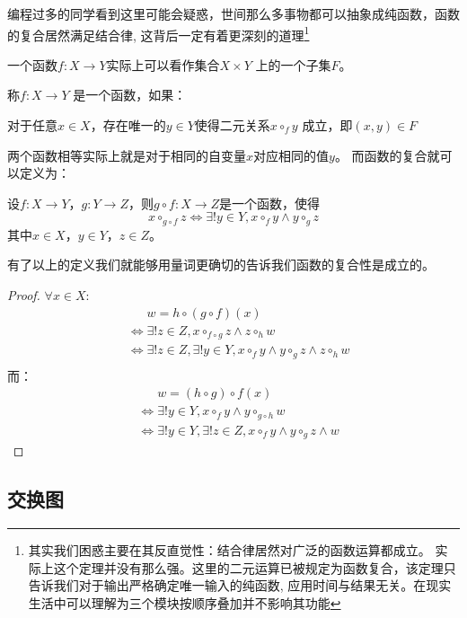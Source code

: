 编程过多的同学看到这里可能会疑惑，世间那么多事物都可以抽象成纯函数，函数的复合居然满足结合律,
这背后一定有着更深刻的道理\footnote{其实我们困惑主要在其反直觉性：结合律居然对广泛的函数运算都成立。
    实际上这个定理并没有那么强。这里的二元运算已被规定为函数复合，该定理只告诉我们对于输出严格确定唯一输入的纯函数,
应用时间与结果无关。在现实生活中可以理解为三个模块按顺序叠加并不影响其功能}

一个函数\(f: X \to Y\)实际上可以看作集合\(X \times Y\) 上的一个子集\(F\)。
\begin{definition}
    称\(f: X\to Y\) 是一个函数，如果：

    对于任意\(x\in X\)，存在唯一的\(y\in Y\)使得二元关系\(x \circ_{f} y\)
    成立，即\((x,y)\in F\)
\end{definition}

两个函数相等实际上就是对于相同的自变量\(x\)对应相同的值\(y\)。
而函数的复合就可以定义为：
\begin{definition}
    设\(f: X\to Y\)，\(g: Y\to Z\)，则\(g\circ f: X \to Z\)是一个函数，使得
    \[
        x \circ_{g\circ f} z \iff \exists! y \in Y, x
        \circ_{f} y \land y \circ_{g} z
    \]
    其中\(x\in X\)，\(y\in Y\)，\(z\in Z\)。
    \end{definition}
    有了以上的定义我们就能够用量词更确切的告诉我们函数的复合性是成立的。
\begin{proof}
    \(\forall x \in X\):
    \begin{align*}
        &\mathrel{\phantom{\iff}}w=h \circ(g\circ f)(x) \\
        &\iff \exists! z \in Z, x \circ_{f\circ g} z \land z
        \circ_{h} w\\
        &\iff \exists! z \in Z, \exists! y \in Y, x
        \circ_{f} y \land y \circ_{g} z \land z
        \circ_{h} w\\
    \end{align*}
    而：
    \begin{align*}
        &\mathrel{\phantom{\iff}}w=(h\circ g)\circ f(x) \\
        &\iff \exists! y \in Y, x \circ_{f} y \land y
        \circ_{g \circ h} w\\
        &\iff \exists! y \in Y, \exists! z \in Z, x
        \circ_{f} y \land y
        \circ_{g} z \land w
    \end{align*}
\end{proof}

\subsection{交换图}

